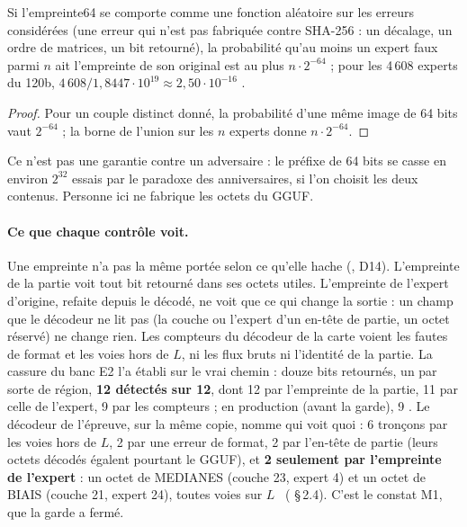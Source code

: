 \begin{proposition}\label{t2fmt:prop:collision}
Si l'empreinte64 se comporte comme une fonction aléatoire sur les erreurs considérées (une erreur qui n'est pas fabriquée contre SHA-256 : un décalage, un ordre de matrices, un bit retourné), la probabilité qu'au moins un expert faux parmi $n$ ait l'empreinte de son original est au plus $n \cdot 2^{-64}$ ; pour les 4\,608 experts du 120b, $4\,608 / 1{,}8447\cdot10^{19} \approx 2{,}50\cdot10^{-16}$ \calc.
\end{proposition}
\begin{proof}
Pour un couple distinct donné, la probabilité d'une même image de 64 bits vaut $2^{-64}$ ; la borne de l'union sur les $n$ experts donne $n \cdot 2^{-64}$.
\end{proof}
Ce n'est pas une garantie contre un adversaire : le préfixe de 64 bits se casse en environ $2^{32}$ essais par le paradoxe des anniversaires, si l'on choisit les deux contenus. Personne ici ne fabrique les octets du GGUF.

\paragraph{Ce que chaque contrôle voit.} Une empreinte n'a pas la même portée selon ce qu'elle hache (, D14). L'empreinte de la partie voit tout bit retourné dans ses octets utiles. L'empreinte de l'expert d'origine, refaite depuis le décodé, ne voit que ce qui change la sortie : un champ que le décodeur ne lit pas (la couche ou l'expert d'un en-tête de partie, un octet réservé) ne change rien. Les compteurs du décodeur de la carte voient les fautes de format et les voies hors de $L$, ni les flux bruts ni l'identité de la partie. La cassure du banc E2 l'a établi sur le vrai chemin : douze bits retournés, un par sorte de région, \textbf{12 détectés sur 12}, dont 12 par l'empreinte de la partie, 11 par celle de l'expert, 9 par les compteurs ; en production (avant la garde), 9 \mes. Le décodeur de l'épreuve, sur la même copie, nomme qui voit quoi : 6 tronçons par les voies hors de $L$, 2 par une erreur de format, 2 par l'en-tête de partie (leurs octets décodés égalent pourtant le GGUF), et \textbf{2 seulement par l'empreinte de l'expert} : un octet de MEDIANES (couche 23, expert 4) et un octet de BIAIS (couche 21, expert 24), toutes voies sur $L$ \mes~( §\,2.4). C'est le constat M1, que la garde a fermé.

